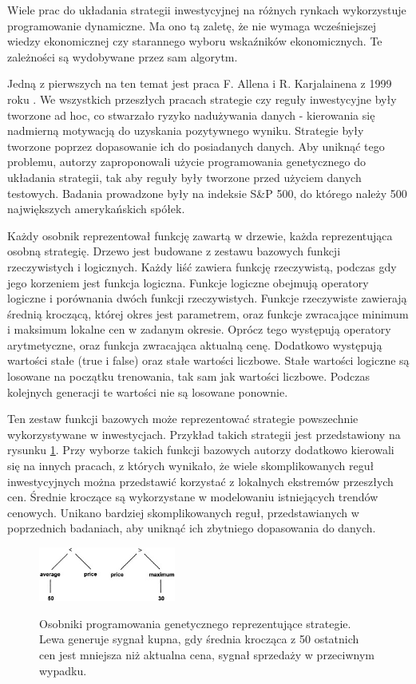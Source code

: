\documentclass[twoside]{iisthesis}
\begin{document}
Wiele prac do układania strategii inwestycyjnej na różnych rynkach wykorzystuje programowanie dynamiczne. Ma ono tą zaletę, że nie wymaga wcześniejszej wiedzy ekonomicznej czy starannego wyboru wskaźników ekonomicznych. Te zależności są wydobywane przez sam algorytm. 

Jedną z pierwszych na ten temat jest praca F. Allena i R. Karjalainena z 1999 roku \cite{Allen1999245}. We wszystkich przeszłych pracach strategie czy reguły inwestycyjne były tworzone ad hoc, co stwarzało ryzyko nadużywania danych - kierowania się nadmierną motywacją do uzyskania pozytywnego wyniku. Strategie były tworzone poprzez dopasowanie ich do posiadanych danych. Aby uniknąć tego problemu, autorzy zaproponowali użycie programowania genetycznego do układania strategii, tak aby reguły były tworzone przed użyciem danych testowych. Badania prowadzone były na indeksie S\&P 500, do którego należy 500 największych amerykańskich spółek. 

Każdy osobnik reprezentował funkcję zawartą w drzewie, każda reprezentująca osobną strategię. Drzewo jest budowane z zestawu bazowych funkcji rzeczywistych i logicznych. Każdy liść zawiera funkcję rzeczywistą, podczas gdy jego korzeniem jest funkcja logiczna. Funkcje logiczne obejmują operatory logiczne i porównania dwóch funkcji rzeczywistych. Funkcje rzeczywiste zawierają średnią kroczącą, której okres jest parametrem, oraz funkcje zwracające minimum i maksimum lokalne cen w zadanym okresie. Oprócz tego występują operatory arytmetyczne, oraz funkcja zwracająca aktualną cenę. Dodatkowo występują wartości stałe (true i false) oraz stałe wartości liczbowe. Stałe wartości logiczne są losowane na początku trenowania, tak sam jak wartości liczbowe. Podczas kolejnych generacji te wartości nie są losowane ponownie.

Ten zestaw funkcji bazowych może reprezentować strategie powszechnie wykorzystywane w inwestycjach. Przykład takich strategii jest przedstawiony na rysunku \ref{fig:allenProste}. Przy wyborze takich funkcji bazowych autorzy dodatkowo kierowali się na innych pracach, z których wynikało, że wiele skomplikowanych reguł inwestycyjnych można przedstawić korzystać z lokalnych ekstremów przeszłych cen. Średnie kroczące są wykorzystane w modelowaniu istniejących trendów cenowych. Unikano bardziej skomplikowanych reguł, przedstawianych w poprzednich badaniach, aby uniknąć ich zbytniego dopasowania do danych.

\begin{figure}[h]
\center
\includegraphics[width=0.4\textwidth]{AllenProste.jpg}
\label{fig:allenProste}
\caption{Osobniki programowania genetycznego reprezentujące strategie. Lewa generuje sygnał kupna, gdy średnia krocząca z 50 ostatnich cen jest mniejsza niż aktualna cena, sygnał sprzedaży w przeciwnym wypadku.}
\end{figure}
\end{document}

